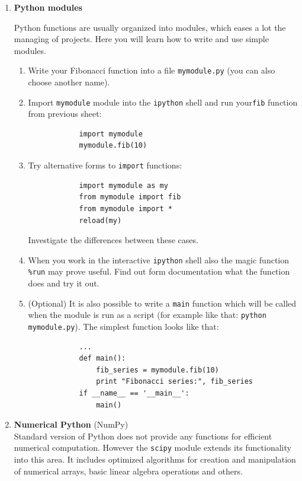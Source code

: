 \documentclass[12pt, a4]{article}
\begin{document}
\begin{enumerate}

    \item \textbf{Python modules}

    Python functions are usually organized into modules, which eases a lot the managing of projects. Here you will learn how to write and use simple modules.
    \begin{enumerate}
        \item Write your Fibonacci function into a file \texttt{mymodule.py} (you can also choose another name).
        \item Import \texttt{mymodule} module into the
            \texttt{ipython} shell and run your\texttt{fib} function
            from previous sheet:
        \begin{verbatim}
            import mymodule
            mymodule.fib(10)
        \end{verbatim} 
        \item Try alternative forms to \texttt{import} functions:
        \begin{verbatim}
            import mymodule as my
            from mymodule import fib
            from mymodule import *
            reload(my)
        \end{verbatim}
        Investigate the differences between these cases.
    \item When you work in the interactive \texttt{ipython} shell also
        the magic function \texttt{\%run} may prove useful.
            Find out form documentation what the function does and try
            it out.
        \item (Optional) It is also possible to write a \texttt{main} function which will be called when the module is run as a script (for example like that: \texttt{python mymodule.py}). The simplest function looks like that:
        \begin{verbatim}
            ...
            def main():
                fib_series = mymodule.fib(10)
                print "Fibonacci series:", fib_series
            if __name__ == '__main__':
                main()
        \end{verbatim}
    \end{enumerate}

    \item \textbf{Numerical Python} (NumPy) \\
    Standard version of Python does not provide any functions for
    efficient numerical computation. However the \texttt{scipy} module
    extends its functionality into this area. It includes optimized
    algorithms for creation and manipulation of numerical arrays, basic
    linear algebra operations and others.
    

\end{enumerate}
\end{document}
